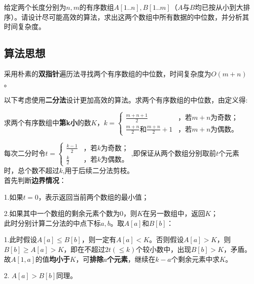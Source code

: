 \documentclass{article}
\begin{document}
给定两个长度分别为$n,m$的有序数组$A[1..n], B[1..m]$（$A$与$B$均已按从小到大排序）。请设计尽可能高效的算法，求出这两个数组中所有数据的中位数，并分析其时间复杂度。


\subsection{算法思想}
采用朴素的\textbf{双指针}遍历法寻找两个有序数组的中位数，时间复杂度为\textbf{$O(m+n)$}。

以下考虑使用\textbf{二分法}设计更加高效的算法。求两个有序数组的中位数，由定义得:

求两个有序数组中\textbf{第k小}的数$K$，$k=
\begin{cases}
\frac{m+n+1}{2}& \text{，若$m+n$为奇数；}\\
\text{$\frac{m+n}{2}$和$\frac{m+n}{2}+1$}& \text{，若$m+n$为偶数。}
\end{cases}$

每次二分时令$t=
\begin{cases}
\frac{k-1}{2}& \text{，若$k$为奇数；}\\
\frac{k}{2}& \text{，若$k$为偶数。}
\end{cases}$,即保证从两个数组分别取前$t$个元素时，总个数不超过$k$,用于后续二分法剪枝。\\

首先判断\textbf{边界情况}：

\noindent
{}
\setlength{\hangindent}{48pt}
\hspace{45pt}1.如果$t=0$，表示返回当前两个数组的最小值；

\noindent
{}
\setlength{\hangindent}{48pt}
\hspace{45pt}2.如果其中一个数组的剩余元素个数为$0$，则$K$在另一数组中，返回$K$；\\

此时分别计算二分法的中点下标$a,b$。取$A[a]$和$B[b]$：

\noindent
{}
\setlength{\hangindent}{60pt}
\hspace{45pt}1.此时假设$A[a]\leq B[b]$，则一定有$A[a]< K$。否则假设$A[a]> K$，则$B[b]\geq A[a]> K$，即在不超过$2t(\leq k)$个较小数中，出现$B[b]>K$，矛盾。\\
故$A[1,a]$的值\textbf{均小于$K$}，可\textbf{排除$a$个元素}，继续在$k-a$个剩余元素中求$K$。

\noindent
{}
\setlength{\hangindent}{45pt}
\hspace{45pt}2. $A[a]>B[b]$同理。
\end{document}
